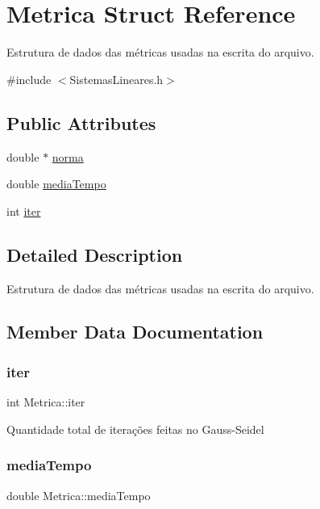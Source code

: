 \hypertarget{structMetrica}{}\section{Metrica Struct Reference}
\label{structMetrica}


Estrutura de dados das métricas usadas na escrita do arquivo.  




{\ttfamily \#include $<$Sistemas\+Lineares.\+h$>$}

\subsection*{Public Attributes}
\begin{DoxyCompactItemize}
\item 
double $\ast$ \hyperlink{structMetrica_a213ed1c24b4afdc96ce9c91f9a6c6301}{norma}
\item 
double \hyperlink{structMetrica_aac2c1968ef74093c6c92364eedfc120e}{media\+Tempo}
\item 
int \hyperlink{structMetrica_a3cdc8f8c5ed005c8f6788d9b33831cc1}{iter}
\end{DoxyCompactItemize}


\subsection{Detailed Description}
Estrutura de dados das métricas usadas na escrita do arquivo. 

\subsection{Member Data Documentation}
\mbox{\label{structMetrica_a3cdc8f8c5ed005c8f6788d9b33831cc1}} 
\subsubsection{\texorpdfstring{iter}{iter}}
{\footnotesize\ttfamily int Metrica\+::iter}

Quantidade total de iterações feitas no Gauss-\/\+Seidel \mbox{\label{structMetrica_aac2c1968ef74093c6c92364eedfc120e}} 
\subsubsection{\texorpdfstring{media\+Tempo}{mediaTempo}}
{\footnotesize\ttfamily double Metrica\+::media\+Tempo}

